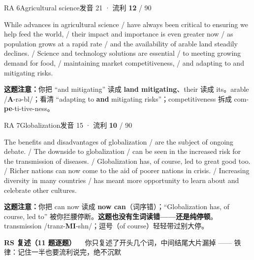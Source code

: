 \documentclass[11pt]{article}
\newcommand{\szero}[1]{\textcolor{cWrong}{\bfseries #1}}
\newcommand{\hl}[1]{\textcolor{cWrong}{\bfseries #1}}   %
\newcommand{\ptetask}[2]{%
  \needspace{4\baselineskip}\medskip
  \begin{tcolorbox}[enhanced, colback=cHead, colframe=cHead, sharp corners,
     left=12pt, right=12pt, top=5pt, bottom=5pt, boxrule=0pt]
    {\large\bfseries\color{white} #1}\ \ {\color{white!80} #2}
  \end{tcolorbox}\smallskip}
\begin{document}
\begin{qblock}{RA 6\quad Agricultural science}{发音 21 · 流利 \szero{12} / 90}
\begin{promptbox}\small
While advances in agricultural science / have always been critical to ensuring we help feed the world, / their impact and importance is even greater now / as population grows at a rapid rate / and the availability of arable land steadily declines. / Science and technology solutions are essential / to meeting growing demand for food, / maintaining market competitiveness, / and adapting to and mitigating risks.
\end{promptbox}
\textbf{这题注意：}你把 ``and mitigating'' 读成 \hl{land mitigating}、their 读成 its。arable /\textbf{A}-rə-bl/；看清 ``adapting to \textbf{and} mitigating risks''；competitiveness 拆成 com-\textbf{pe}-ti-tive-ness。
\end{qblock}

\begin{qblock}{RA 7\quad Globalization}{发音 15 · 流利 \szero{10} / 90}
\begin{promptbox}\small
The benefits and disadvantages of globalization / are the subject of ongoing debate. / The downside to globalization / can be seen in the increased risk for the transmission of diseases. / Globalization has, of course, led to great good too. / Richer nations can now come to the aid of poorer nations in crisis. / Increasing diversity in many countries / has meant more opportunity to learn about and celebrate other cultures.
\end{promptbox}
\textbf{这题注意：}你把 can now 读成 \hl{now can}（词序错）；``Globalization has, of course, led to'' 被你拦腰停断。\textbf{这题也没有生词读错——还是纯停顿}。transmission /tranz-\textbf{MI}-shn/；逗号（of course）轻轻带过别大停。
\end{qblock}

\ptetask{RS 复述（11 题逐题）}{你只复述了开头几个词，中间结尾大片漏掉 —— 铁律：记住一半也要流利说完，绝不沉默}
\end{document}
